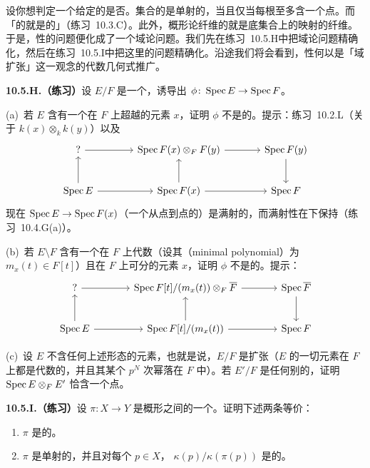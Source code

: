 设你想判定一个给定的\trMorphism{}是否\trUniversallyInjective{}。集合的\trMap{}是单射的，当且仅当每根\trFiber{}至多含一个点。而「\trBaseChange{}的\trFiber{}就是\trFiber{}的\trBaseChange」（\mbox{练习~10.3.C}）。此外，概形论纤维的\trUnderlyingSet{}就是底集合上的映射的纤维。于是，\trUniversallyInjective{}性的问题便化成了一个域论问题。我们先在\mbox{练习~10.5.H}中把域论问题精确化，然后在\mbox{练习~10.5.I}中把这里的问题精确化。沿途我们将会看到，\trUniversallyInjective{}性何以是「\trPurelyInseparable{}域扩张」这一观念的代数几何式推广。

\textbf{10.5.H.（练习）}\quad 设 $E/F$ 是一个\trFieldExtension，诱导出 $\phi\colon\operatorname{Spec} E\to\operatorname{Spec} F$。

(a)~若 $E$ 含有一个在 $F$ 上超越的元素 $x$，证明 $\phi$ 不是\trUniversallyInjective{}的。提示：\mbox{练习~10.2.L}（关于 $k(x)\otimes_k k(y)$）以及\trCartesianDiagram
\[
\begin{tikzcd}[row sep=2.4em, column sep=3.6em]
? \ar[r] & \Spec F(x)\otimes_F F(y) \ar[r] & \Spec F(y) \ar[d] \\
\Spec E \ar[r] \ar[u] & \Spec F(x) \ar[r] \ar[u] & \Spec F
\end{tikzcd}
\]
现在 $\operatorname{Spec} E\to\operatorname{Spec} F(x)$（一个从点到点的\trMap）是满射的，而满射性在\trBaseChange{}下保持（\mbox{练习~10.4.G}(a)）。

(b)~若 $E\setminus F$ 含有一个在 $F$ 上代数（设其\trMinimalPolynomial{}（minimal polynomial）为 $m_x(t)\in F[t]$）且在 $F$ 上可分的元素 $x$，证明 $\phi$ 不是\trUniversallyInjective{}的。提示：\trCartesianDiagram
\[
\begin{tikzcd}[row sep=2.4em, column sep=3.6em]
? \ar[r] & \Spec F[t]/(m_x(t))\otimes_F\overline{F} \ar[r] & \Spec\overline{F} \ar[d] \\
\Spec E \ar[r] \ar[u] & \Spec F[t]/(m_x(t)) \ar[r] \ar[u] & \Spec F
\end{tikzcd}
\]

(c)~设 $E$ 不含任何上述形态的元素，也就是说，$E/F$ 是\trPurelyInseparable{}扩张（$E$ 的一切元素在 $F$ 上都是代数的，并且其某个 $p^N$ 次幂落在 $F$ 中）。若 $E'/F$ 是任何别的\trFieldExtension，证明 $\operatorname{Spec} E\otimes_F E'$ 恰含一个点。

\textbf{10.5.I.（练习）}\quad 设 $\pi\colon X\to Y$ 是概形之间的一个\trMorphism。证明下述两条等价：
\begin{enumerate}[label=(\roman*)]
  \item \trMorphism{} $\pi$ 是\trUniversallyInjective{}的。
  \item \trMorphism{} $\pi$ 是单射的，并且对每个 $p\in X$，\trFieldExtension{} $\kappa(p)/\kappa(\pi(p))$ 是\trPurelyInseparable{}的。
\end{enumerate}

